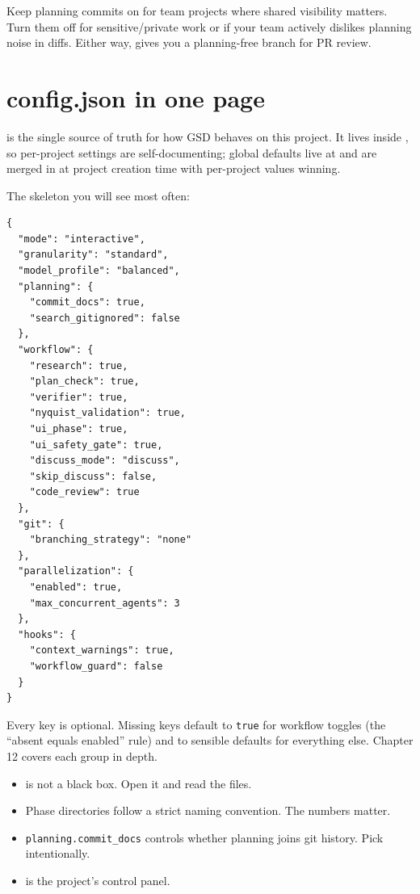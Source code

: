 \documentclass[11pt,letterpaper,openany]{book}
\begin{document}
Keep planning commits on for team projects where shared visibility matters. Turn them off for sensitive/private work or if your team actively dislikes planning noise in diffs. Either way,  gives you a planning-free branch for PR review.

\section{config.json in one page}

 is the single source of truth for how GSD behaves on this project. It lives inside , so per-project settings are self-documenting; global defaults live at  and are merged in at project creation time with per-project values winning.

The skeleton you will see most often:

\begin{lstlisting}
{
  "mode": "interactive",
  "granularity": "standard",
  "model_profile": "balanced",
  "planning": {
    "commit_docs": true,
    "search_gitignored": false
  },
  "workflow": {
    "research": true,
    "plan_check": true,
    "verifier": true,
    "nyquist_validation": true,
    "ui_phase": true,
    "ui_safety_gate": true,
    "discuss_mode": "discuss",
    "skip_discuss": false,
    "code_review": true
  },
  "git": {
    "branching_strategy": "none"
  },
  "parallelization": {
    "enabled": true,
    "max_concurrent_agents": 3
  },
  "hooks": {
    "context_warnings": true,
    "workflow_guard": false
  }
}
\end{lstlisting}

Every key is optional. Missing keys default to \texttt{true} for workflow toggles (the ``absent equals enabled'' rule) and to sensible defaults for everything else. Chapter 12 covers each group in depth.

\begin{gsdnote}[title=Key Takeaways]
\begin{itemize}[itemsep=2pt,leftmargin=1.2em]
  \item {} is not a black box. Open it and read the files.
  \item Phase directories follow a strict naming convention. The numbers matter.
  \item \texttt{planning.commit\_docs} controls whether planning joins git history. Pick intentionally.
  \item {} is the project's control panel.
\end{itemize}
\end{gsdnote}
\end{document}
